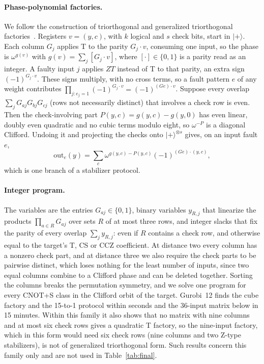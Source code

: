 \documentclass[aps,prl,reprint,twocolumn,amsmath,amssymb,floatfix,nofootinbib,superscriptaddress]{revtex4-2}
\begin{document}
\paragraph*{Phase-polynomial factories.}
We follow the construction of triorthogonal and generalized triorthogonal factories~\cite{bravyihaah,haah}. Registers $v=(y,c)$, with $k$ logical and $s$ check bits, start in $|{+}\rangle$. Each column $G_j$ applies T to the parity $G_j\cdot v$, consuming one input, so the phase is $\omega^{g(v)}$ with $g(v)=\sum_j[G_j\cdot v]$, where $[\cdot]\in\{0,1\}$ is a parity read as an integer. A faulty input $j$ applies $ZT$ instead of T to that parity, an extra sign $(-1)^{G_j\cdot v}$. These signs multiply, with no cross terms, so a fault pattern $e$ of any weight contributes $\prod_{j:e_j=1}(-1)^{G_j\cdot v}=(-1)^{(Ge)\cdot v}$. Suppose every overlap $\sum_jG_{aj}G_{bj}G_{cj}$ (rows not necessarily distinct) that involves a check row is even. Then the check-involving part $P(y,c)=g(y,c)-g(y,0)$ has even linear, doubly even quadratic and no cubic terms modulo eight, so $\omega^{-P}$ is a diagonal Clifford. Undoing it and projecting the checks onto $|{+}\rangle^{\otimes s}$ gives, on an input fault $e$,
\begin{equation}
 \mathrm{out}_e(y)=\textstyle\sum_c\omega^{g(y,c)-P(y,c)}(-1)^{(Ge)\cdot(y,c)},
 \label{eq:out}
\end{equation}
which is one branch of a stabilizer protocol.

\paragraph*{Integer program.}
The variables are the entries $G_{aj}\in\{0,1\}$, binary variables $y_{R,j}$ that linearize the products $\prod_{a\in R}G_{aj}$ over sets $R$ of at most three rows, and integer slacks that fix the parity of every overlap $\sum_jy_{R,j}$: even if $R$ contains a check row, and otherwise equal to the target's T, CS or CCZ coefficient. At distance two every column has a nonzero check part, and at distance three we also require the check parts to be pairwise distinct, which loses nothing for the least number of inputs, since two equal columns combine to a Clifford phase and can be deleted together. Sorting the columns breaks the permutation symmetry, and we solve one program for every CNOT+S class in the Clifford orbit of the target. Gurobi~12 finds the cube factory and the 15-to-1 protocol within seconds and the 36-input matrix below in 15 minutes. Within this family it also shows that no matrix with nine columns and at most six check rows gives a quadratic T factory, so the nine-input factory, which in this form would need six check rows (nine columns and two Z-type stabilizers), is not of generalized triorthogonal form. Such results concern this family only and are not used in Table~\ref{tab:final}.
\end{document}

